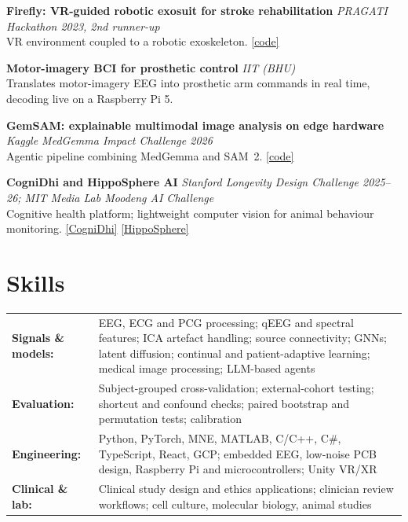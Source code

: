 \documentclass[10pt,a4paper]{article}
\newcommand{\project}[3]{
  \noindent\textbf{#1} \hfill \textit{\small #2} \\
  {\small #3} \par
  \vspace{4pt}
}
\begin{document}
\project{Firefly: VR-guided robotic exosuit for stroke rehabilitation}{PRAGATI Hackathon 2023, 2nd runner-up}
{VR environment coupled to a robotic exoskeleton. \href{https://github.com/soinikghosh9/Firefly}{[code]}}

\project{Motor-imagery BCI for prosthetic control}{IIT (BHU)}
{Translates motor-imagery EEG into prosthetic arm commands in real time, decoding live on a Raspberry Pi 5.}

\project{GemSAM: explainable multimodal image analysis on edge hardware}{Kaggle MedGemma Impact Challenge 2026}
{Agentic pipeline combining MedGemma and SAM~2. \href{https://github.com/soinikghosh9/GemSAM}{[code]}}

\project{CogniDhi and HippoSphere AI}{Stanford Longevity Design Challenge 2025--26; MIT Media Lab Moodeng AI Challenge}
{Cognitive health platform; lightweight computer vision for animal behaviour monitoring. \href{https://cogni-dhi.vercel.app/}{[CogniDhi]} \href{https://github.com/soinikghosh9/hipposphere-ai}{[HippoSphere]}}

\vspace{6pt}

\section{Skills}
\begin{tabularx}{\textwidth}{@{}l X@{}}
\textbf{Signals \& models:} & EEG, ECG and PCG processing; qEEG and spectral features; ICA artefact handling; source connectivity; GNNs; latent diffusion; continual and patient-adaptive learning; medical image processing; LLM-based agents \\
\textbf{Evaluation:} & Subject-grouped cross-validation; external-cohort testing; shortcut and confound checks; paired bootstrap and permutation tests; calibration \\
\textbf{Engineering:} & Python, PyTorch, MNE, MATLAB, C/C++, C\#, TypeScript, React, GCP; embedded EEG, low-noise PCB design, Raspberry Pi and microcontrollers; Unity VR/XR \\
\textbf{Clinical \& lab:} & Clinical study design and ethics applications; clinician review workflows; cell culture, molecular biology, animal studies \\
\end{tabularx}
\end{document}
